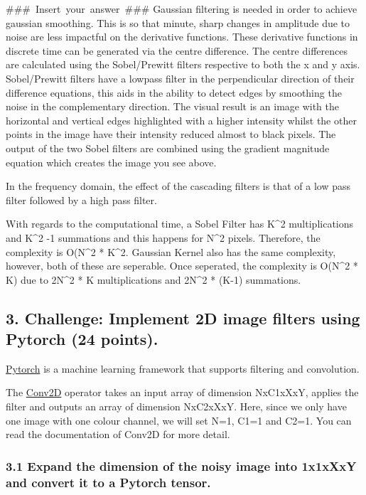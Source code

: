 \documentclass[11pt]{article}
\begin{document}
    \#\#\#~Insert~your~answer~\#\#\# Gaussian filtering is needed in order
to achieve gaussian smoothing. This is so that minute, sharp changes in
amplitude due to noise are less impactful on the derivative functions.
These derivative functions in discrete time can be generated via the
centre difference. The centre differences are calculated using the
Sobel/Prewitt filters respective to both the x and y axis. Sobel/Prewitt
filters have a lowpass filter in the perpendicular direction of their
difference equations, this aids in the ability to detect edges by
smoothing the noise in the complementary direction. The visual result is
an image with the horizontal and vertical edges highlighted with a
higher intensity whilst the other points in the image have their
intensity reduced almost to black pixels. The output of the two Sobel
filters are combined using the gradient magnitude equation which creates
the image you see above.

In the frequency domain, the effect of the cascading filters is that of
a low pass filter followed by a high pass filter.

With regards to the computational time, a Sobel Filter has K\^{}2
multiplications and K\^{}2 -1 summations and this happens for N\^{}2
pixels. Therefore, the complexity is O(N\^{}2 * K\^{}2. Gaussian Kernel
also has the same complexity, however, both of these are seperable. Once
seperated, the complexity is O(N\^{}2 * K) due to 2N\^{}2 * K
multiplications and 2N\^{}2 * (K-1) summations.

    \hypertarget{challenge-implement-2d-image-filters-using-pytorch-24-points.}{%
\subsection{3. Challenge: Implement 2D image filters using Pytorch (24
points).}\label{challenge-implement-2d-image-filters-using-pytorch-24-points.}}

\href{https://pytorch.org/}{Pytorch} is a machine learning framework
that supports filtering and convolution.

The \href{https://pytorch.org/docs/stable/nn.html\#conv2d}{Conv2D}
operator takes an input array of dimension NxC1xXxY, applies the filter
and outputs an array of dimension NxC2xXxY. Here, since we only have one
image with one colour channel, we will set N=1, C1=1 and C2=1. You can
read the documentation of Conv2D for more detail.

    \hypertarget{expand-the-dimension-of-the-noisy-image-into-1x1xxxy-and-convert-it-to-a-pytorch-tensor.}{%
\subsubsection{3.1 Expand the dimension of the noisy image into 1x1xXxY
and convert it to a Pytorch
tensor.}\label{expand-the-dimension-of-the-noisy-image-into-1x1xxxy-and-convert-it-to-a-pytorch-tensor.}}
\end{document}
